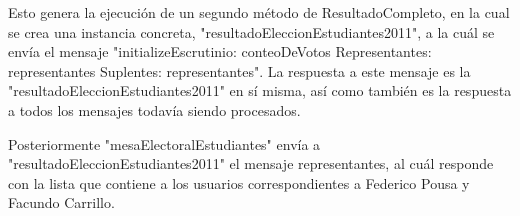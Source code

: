 Esto genera la ejecución de un segundo método de ResultadoCompleto, en la cual se crea una instancia concreta, "resultadoEleccionEstudiantes2011", a la cuál se envía el mensaje "initializeEscrutinio: conteoDeVotos Representantes: representantes Suplentes: representantes". La respuesta a este mensaje es la "resultadoEleccionEstudiantes2011" en sí misma, así como también es la respuesta a todos los mensajes todavía siendo procesados.


Posteriormente "mesaElectoralEstudiantes" envía a "resultadoEleccionEstudiantes2011" el mensaje representantes, al cuál responde con la lista que contiene a los usuarios correspondientes a Federico Pousa y Facundo Carrillo.

